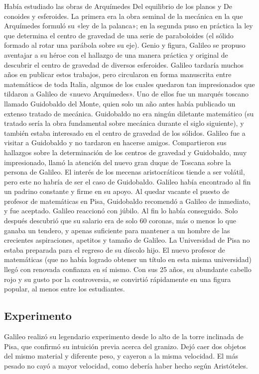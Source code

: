 \documentclass[letterpaper, 10pt, journal]{IEEEtran}
\begin{document}
Había estudiado las obras de Arquímedes Del equilibrio de los planos y De conoides y esferoides. La primera era la obra seminal de la mecánica en la que Arquímedes formuló su «ley de la palanca»; en la segunda puso en práctica la ley que determina el centro de gravedad de una serie de paraboloides (el sólido formado al rotar una parábola sobre su eje). Genio y figura, Galileo se propuso aventajar a su héroe con el hallazgo de una manera práctica y original de descubrir el centro de gravedad de diversos esferoides. Galileo tardaría muchos años en publicar estos trabajos, pero circularon en forma manuscrita entre matemáticos de toda Italia, algunos de los cuales quedaron tan impresionados que tildaron a Galileo de «nuevo Arquímedes». Uno de ellos fue un marqués toscano llamado Guidobaldo del Monte, quien solo un año antes había publicado un extenso tratado de mecánica. Guidobaldo no era ningún diletante matemático (su tratado sería la obra fundamental sobre mecánica durante el siglo siguiente), y también estaba interesado en el centro de gravedad de los sólidos. Galileo fue a visitar a Guidobaldo y no tardaron en hacerse amigos. Compartieron sus hallazgos sobre la determinación de los centros de gravedad y Guidobaldo, muy impresionado, llamó la atención del nuevo gran duque de Toscana sobre la persona de Galileo.\cite{[2]}
\newline
El interés de los mecenas aristocráticos tiende a ser volátil, pero este no habría de ser el caso de Guidobaldo. Galileo había encontrado al fin un padrino constante y firme en su apoyo. Al quedar vacante el puesto de profesor de matemáticas en Pisa, Guidobaldo recomendó a Galileo de inmediato, y fue aceptado. Galileo reaccionó con júbilo. Al fin lo había conseguido. Solo después descubrió que su salario era de solo 60 coronas, más o menos lo que ganaba un tendero, y apenas suficiente para mantener a un hombre de las crecientes aspiraciones, apetitos y tamaño de Galileo. \cite{[2]}
\newline
La Universidad de Pisa no estaba preparada para el regreso de su díscolo hijo. El nuevo profesor de matemáticas (que no había logrado obtener un título en esta misma universidad) llegó con renovada confianza en sí mismo. Con sus 25 años, su abundante cabello rojo y su gusto por la controversia, se convirtió rápidamente en una figura popular, al menos entre los estudiantes.\cite{[2]}

\subsection{Experimento}
Galileo realizó su legendario experimento desde lo alto de la torre inclinada de Pisa, que confirmó su intuición previa acerca del granizo. Dejó caer dos objetos del mismo material y diferente peso, y cayeron a la misma velocidad. El más pesado no cayó a mayor velocidad, como debería haber hecho según Aristóteles.
\end{document}
